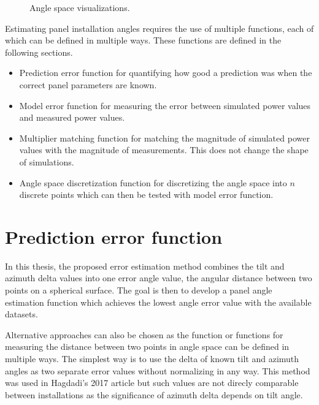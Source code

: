\begin{figure}[h]
\begin{subfigure}[b]{0.35\textwidth}
         \label{fig_anglespace1}
     \end{subfigure}
     \hfill
     \caption{Angle space visualizations.}
     \label{fig_anglespace}
\end{figure}


\noindent Estimating panel installation angles requires the use of multiple functions, each of which can be defined in multiple ways. These functions are defined in the following sections.
\begin{itemize}
  \item Prediction error function for quantifying how good a prediction was when the correct panel parameters are known.
  \item Model error function for measuring the error between simulated power values and measured power values.
  \item Multiplier matching function for matching the magnitude of simulated power values with the magnitude of measurements. This does not change the shape of simulations.
  \item Angle space discretization function for discretizing the angle space into $n$ discrete points which can then be tested with model error function.
\end{itemize}




\section{Prediction error function}
In this thesis, the proposed error estimation method combines the tilt and azimuth delta values into one error angle value, the angular distance between two points on a spherical surface. The goal is then to develop a panel angle estimation function which achieves the lowest angle error value with the available datasets.

Alternative approaches can also be chosen as the function or functions for measuring the distance between two points in angle space can be defined in multiple ways. The simplest way is to use the delta of known tilt and azimuth angles as two separate error values without normalizing in any way. This method was used in Hagdadi's 2017 article but such values are not direcly comparable between installations as the significance of azimuth delta depends on tilt angle.

